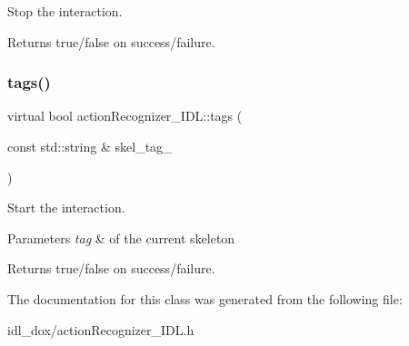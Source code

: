 Stop the interaction. 

\begin{DoxyReturn}{Returns}
true/false on success/failure. 
\end{DoxyReturn}
\mbox{\label{classactionRecognizer__IDL_ad36ae79c77c3f38322202013ea418d84}} 
\subsubsection{\texorpdfstring{tags()}{tags()}}
{\footnotesize\ttfamily virtual bool action\+Recognizer\+\_\+\+I\+D\+L\+::tags (\begin{DoxyParamCaption}\item[{const std\+::string \&}]{skel\+\_\+tag\+\_\+ }\end{DoxyParamCaption})\hspace{0.3cm}{\ttfamily [virtual]}}



Start the interaction. 


\begin{DoxyParams}{Parameters}
{\em tag} & of the current skeleton \\
\hline
\end{DoxyParams}
\begin{DoxyReturn}{Returns}
true/false on success/failure. 
\end{DoxyReturn}


The documentation for this class was generated from the following file\+:\begin{DoxyCompactItemize}
\item 
idl\+\_\+dox/action\+Recognizer\+\_\+\+I\+D\+L.\+h\end{DoxyCompactItemize}
